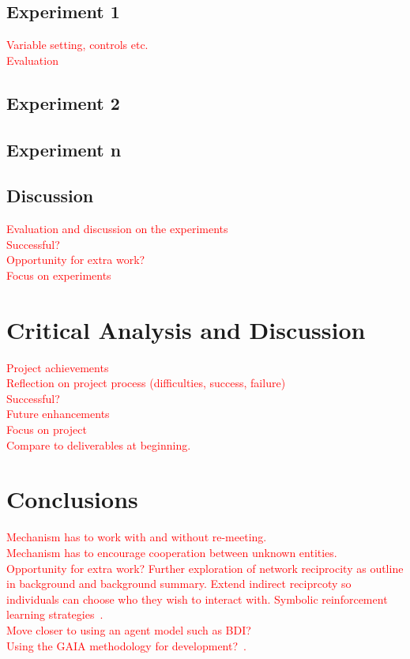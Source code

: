 \documentclass[]{final_report}
\begin{document}
\section{Experiment 1}
\textcolor{red}{Variable setting, controls etc.\\
Evaluation}

\section{Experiment 2}

\section{Experiment n}

\section{Discussion}
\textcolor{red}{Evaluation and discussion on the experiments\\
Successful?\\
Opportunity for extra work?\\
Focus on experiments}

\chapter{Critical Analysis and Discussion}
\textcolor{red}{Project achievements\\
Reflection on project process (difficulties, success, failure)\\
Successful?\\
Future enhancements\\
Focus on project\\
Compare to deliverables at beginning.}

\chapter{Conclusions}
\textcolor{red}{Mechanism has to work with and without re-meeting.\\
Mechanism has to encourage cooperation between unknown entities.\\
Opportunity for extra work? Further exploration of network reciprocity as outline in background and background summary. Extend indirect reciprcoty so individuals can choose who they wish to interact with. Symbolic reinforcement learning strategies~\cite{harper2017reinforcement}.\\
Move closer to using an agent model such as BDI?\\
Using the GAIA methodology for development?~\cite{wooldridge2000gaia}.\\}
\end{document}
